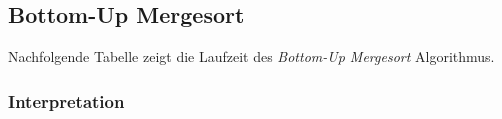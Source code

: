 \subsection{Bottom-Up Mergesort}

Nachfolgende Tabelle zeigt die Laufzeit des \textit{Bottom-Up Mergesort} Algorithmus.

\subsubsection{Interpretation}
